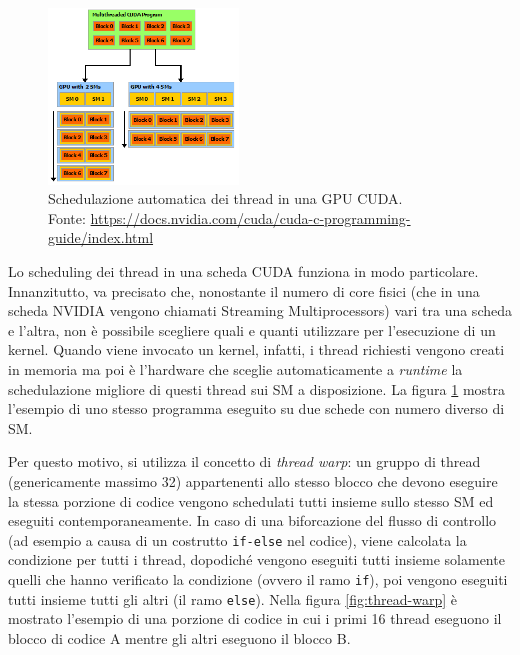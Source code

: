 \documentclass[12pt,a4paper,oneside]{book}
\begin{document}
	\begin{figure}
		\centering
		\includegraphics[width=0.45\textwidth]{automatic-scalability}
		\caption{Schedulazione automatica dei thread in una GPU CUDA.\\Fonte: \url{https://docs.nvidia.com/cuda/cuda-c-programming-guide/index.html}}
		\label{fig:automatic-scalability}
	\end{figure}
	
	Lo scheduling dei thread in una scheda CUDA funziona in modo particolare. Innanzitutto, va precisato che, nonostante il numero di core fisici (che in una scheda NVIDIA vengono chiamati Streaming Multiprocessors) vari tra una scheda e l'altra, non è possibile scegliere quali e quanti utilizzare per l'esecuzione di un kernel. Quando viene invocato un kernel, infatti, i thread richiesti vengono creati in memoria ma poi è l'hardware che sceglie automaticamente a \textit{runtime} la schedulazione migliore di questi thread sui SM a disposizione. La figura \ref{fig:automatic-scalability} mostra l'esempio di uno stesso programma eseguito su due schede con numero diverso di SM.

	Per questo motivo, si utilizza il concetto di \textit{thread warp}: un gruppo di thread (genericamente massimo 32) appartenenti allo stesso blocco che devono eseguire la stessa porzione di codice vengono schedulati tutti insieme sullo stesso SM ed eseguiti contemporaneamente. In caso di una biforcazione del flusso di controllo (ad esempio a causa di un costrutto \texttt{if-else} nel codice), viene calcolata la condizione per tutti i thread, dopodiché vengono eseguiti tutti insieme solamente quelli che hanno verificato la condizione (ovvero il ramo \texttt{if}), poi vengono eseguiti tutti insieme tutti gli altri (il ramo \texttt{else}). Nella figura \ref{fig:thread-warp} è mostrato l'esempio di una porzione di codice in cui i primi 16 thread eseguono il blocco di codice A mentre gli altri eseguono il blocco B.
	
\end{document}
